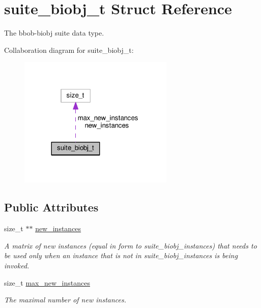 \hypertarget{structsuite__biobj__t}{}\section{suite\+\_\+biobj\+\_\+t Struct Reference}
\label{structsuite__biobj__t}


The bbob-\/biobj suite data type.  




Collaboration diagram for suite\+\_\+biobj\+\_\+t\+:\nopagebreak
\begin{figure}[H]
\begin{center}
\leavevmode
\includegraphics[width=209pt]{structsuite__biobj__t__coll__graph}
\end{center}
\end{figure}
\subsection*{Public Attributes}
\begin{DoxyCompactItemize}
\item 
size\+\_\+t $\ast$$\ast$ \hyperlink{structsuite__biobj__t_a40406a4adac56b2a217170b2129df1eb}{new\+\_\+instances}\hypertarget{structsuite__biobj__t_a40406a4adac56b2a217170b2129df1eb}{}\label{structsuite__biobj__t_a40406a4adac56b2a217170b2129df1eb}

\begin{DoxyCompactList}\small\item\em A matrix of new instances (equal in form to suite\+\_\+biobj\+\_\+instances) that needs to be used only when an instance that is not in suite\+\_\+biobj\+\_\+instances is being invoked. \end{DoxyCompactList}\item 
size\+\_\+t \hyperlink{structsuite__biobj__t_a6ddcc51378512d6296b7d195f7ce583b}{max\+\_\+new\+\_\+instances}\hypertarget{structsuite__biobj__t_a6ddcc51378512d6296b7d195f7ce583b}{}\label{structsuite__biobj__t_a6ddcc51378512d6296b7d195f7ce583b}

\begin{DoxyCompactList}\small\item\em The maximal number of new instances. \end{DoxyCompactList}\end{DoxyCompactItemize}


